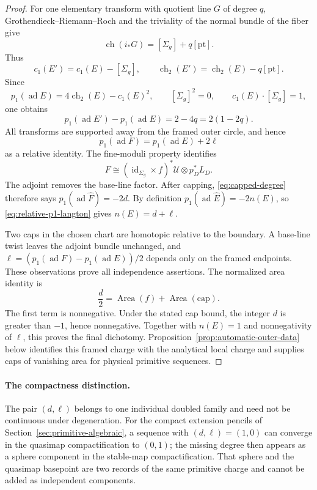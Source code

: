 \documentclass[11pt]{amsart}
\theoremstyle{definition}
\theoremstyle{remark}
\theoremstyle{plain}
\newcommand{\ad}{\operatorname{ad}}
\newcommand{\id}{\operatorname{id}}
\begin{document}
\begin{proof}
For one elementary transform with quotient line $G$ of degree $q$,
Grothendieck--Riemann--Roch and the triviality of the normal bundle of the
fiber give
\[
 \operatorname{ch}(i_*G)=[\Sigma_g]+q[\mathrm{pt}].
\]
Thus
\[
 c_1(E')=c_1(E)-[\Sigma_g],\qquad
 \operatorname{ch}_2(E')=\operatorname{ch}_2(E)-q[\mathrm{pt}].
\]
Since
\[
 p_1(\ad E)=4\operatorname{ch}_2(E)-c_1(E)^2,\qquad
 [\Sigma_g]^2=0,\qquad c_1(E)\cdot[\Sigma_g]=1,
\]
one obtains
\[
 p_1(\ad E')-p_1(\ad E)=2-4q=2(1-2q).
\]
All transforms are supported away from the framed outer circle, and hence
\begin{equation}\label{eq:relative-p1-langton}
              p_1(\ad F)=p_1(\ad E)+2\ell
\end{equation}
as a relative identity.  The fine-moduli property identifies
\[
 F\cong(\id_{\Sigma_g}\times f)^*\mathcal U\otimes p_D^*L_D.
\]
The adjoint removes the base-line factor.  After capping,
\eqref{eq:capped-degree} therefore says $p_1(\ad\widehat F)=-2d$.
By definition $p_1(\ad\widehat E)=-2n(E)$, so
\eqref{eq:relative-p1-langton} gives $n(E)=d+\ell$.

Two caps in the chosen chart are homotopic relative to the boundary.
A base-line twist leaves the adjoint bundle unchanged, and
$\ell=(p_1(\ad F)-p_1(\ad E))/2$ depends only on the framed endpoints.
These observations prove all independence assertions. The normalized
area identity is
\[
 \frac d2=\operatorname{Area}(f)
                         +\operatorname{Area}(\text{cap}).
\]
The first term is nonnegative. Under the stated cap bound,
the integer $d$ is greater than $-1$, hence nonnegative.
Together with $n(E)=1$ and nonnegativity of $\ell$, this proves
the final dichotomy. Proposition~\ref{prop:automatic-outer-data}
below identifies this framed charge with the analytical local
charge and supplies caps of vanishing area for physical
primitive sequences.
\end{proof}

\paragraph{The compactness distinction.}
The pair $(d,\ell)$ belongs to one individual doubled family and need not
be continuous under degeneration. For the compact extension pencils
of Section~\ref{sec:primitive-algebraic}, a sequence with
$(d,\ell)=(1,0)$ can converge in the quasimap compactification
to $(0,1)$; the missing degree then appears as a sphere component
in the stable-map compactification.
That sphere and the quasimap basepoint are two records of the same
primitive charge and cannot be added as independent components.
\end{document}
